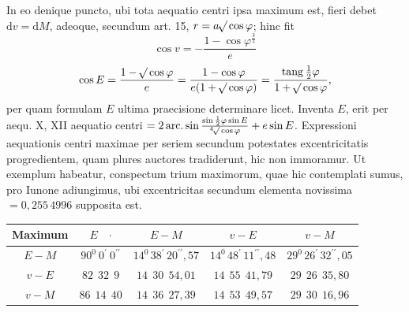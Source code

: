 In eo denique puncto, ubi tota aequatio centri ipsa maximum est, fieri debet $\mathrm{d}v=\mathrm{d}M$, adeoque, secundum art. 15, $r=a\BareRoot{\cos\varphi}$; hinc fit
\[
\cos v=-\frac{1-\cos\varphi^{\frac{3}{2}}}{e}
\]
\[
\cos E=\frac{1-\BareRoot{\cos\varphi}}{e}=\frac{1-\cos\varphi}{e(1+\BareRoot{\cos\varphi})}=\frac{\operatorname{tang}\frac{1}{2}\varphi}{1+\BareRoot{\cos\varphi}},
\]
per quam formulam $E$ ultima praecisione determinare licet. Inventa $E$, erit per aequ. X, XII aequatio centri $=2\operatorname{arc.}\sin\frac{\sin\frac{1}{2}\varphi\sin E}{\BareRoot[4]{\cos\varphi}}+e\sin E$\HistoricalNoteEight{Handschriftliche Bemerkung:] $\sin E=\BareRoot{\frac{\cos\varphi+2\BareRoot{\cos\varphi}+\cos\varphi^{\frac{3}{2}}}{(1+\BareRoot{\cos\varphi})(1+\cos\varphi)}},$ Aequatio centri $=2\operatorname{arc.}\sin\BareRoot{\left(\frac{1}{1+\cos\varphi}-\frac{\BareRoot[4]{(1-e e)}}{2}\right)}+e\sin E=\operatorname{arc.}\cos\frac{-1+\BareRoot{\cos\varphi}+\cos\varphi+\cos\varphi^{\frac{3}{2}}}{1+\cos\varphi}+e\sin E=\operatorname{arc.}\sin(\operatorname{tg}\frac{1}{2}\varphi^2\operatorname{tg}E)+e\sin E.$}. Expressioni aequationis centri maximae per seriem secundum potestates excentricitatis progredientem, quam plures auctores tradiderunt, hic non immoramur. Ut exemplum habeatur, conspectum trium maximorum, quae hic contemplati sumus, pro Iunone adiungimus, ubi excentricitas secundum elementa novissima $=0{,}255\,4996$ supposita est.
\begin{center}
\footnotesize
\setlength{\tabcolsep}{3pt}
\renewcommand{\arraystretch}{1.3}
\begin{tabular}{|c|c|c|c|c|}
\hline
Maximum & $E\quad\text{·}$ & $E-M$ & $v-E$ & $v-M$\\
\hline
$E-M$ & $90^0\ 0^{\prime}\ 0^{\prime\prime}$ & $14^0\,38^{\prime}\,20^{\prime\prime}{,}57$ & $14^0\,48^{\prime}\,11^{\prime\prime}{,}48$ & $29^0\,26^{\prime}\,32^{\prime\prime}{,}05$\\
$v-E$ & $82\ \ 32\ \ 9$ & $14\ \ 30\ \ 54{,}01$ & $14\ \ 55\ \ 41{,}79$ & $29\ \ 26\ \ 35{,}80$\\
$v-M$ & $86\ \ 14\ \ 40$ & $14\ \ 36\ \ 27{,}39$ & $14\ \ 53\ \ 49{,}57$ & $29\ \ 30\ \ 16{,}96$\\
\hline
\end{tabular}
\end{center}
